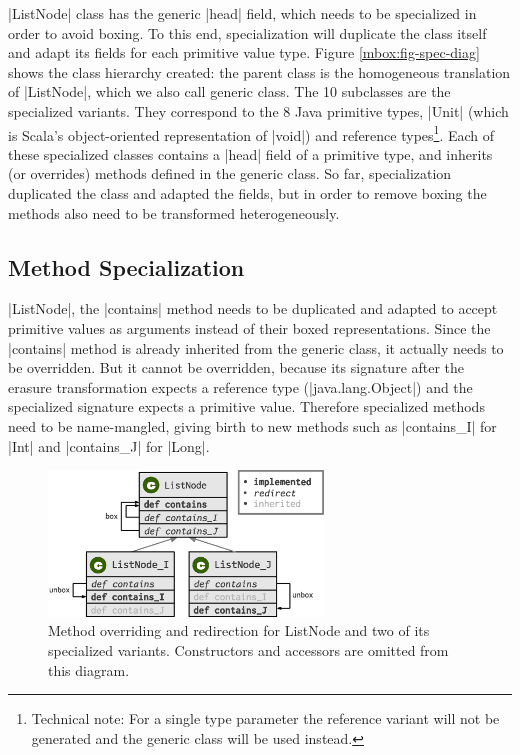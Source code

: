  |ListNode| class has the generic |head| field, which needs to be specialized in order to avoid boxing. To this end, specialization will duplicate the class itself and adapt its fields for each primitive value type. Figure \ref{mbox:fig-spec-diag} shows the class hierarchy created: the parent class is the homogeneous translation of |ListNode|, which we also call generic class. The 10 subclasses are the specialized variants. They correspond to the 8 Java primitive types, |Unit| (which is Scala's object-oriented representation of |void|) and reference types\footnote{Technical note: For a single type parameter the reference variant will not be generated and the generic class will be used instead.}. Each of these specialized classes contains a |head| field of a primitive type, and inherits (or overrides) methods defined in the generic class. So far, specialization duplicated the class and adapted the fields, but in order to remove boxing the methods also need to be transformed heterogeneously.

\subsection{Method Specialization}
\label{mbox:subsec-spec-method}

 |ListNode|, the |contains| method needs to be duplicated and adapted to accept primitive values as arguments instead of their boxed representations. Since the |contains| method is already inherited from the generic class, it actually needs to be overridden. But it cannot be overridden, because its signature after the erasure \cite{java-erasure} transformation expects a reference type (|java.lang.Object|) and the specialized signature expects a primitive value. Therefore specialized methods need to be name-mangled, giving birth to new methods such as |contains_I| for |Int| and |contains_J| for |Long|.

\begin{figure}[t!]
    \vspace{-0.5em}
    \centering
    \includegraphics[width=0.65\textwidth]{diags/spec-methods.eps}
    \caption[Method overriding and redirection for ListNode and two variants]{Method overriding and redirection for ListNode and two of its specialized variants. Constructors and accessors are omitted from this diagram.}
    \label{mbox:fig-redirects}
    \vspace{-0.5em}
\end{figure}

